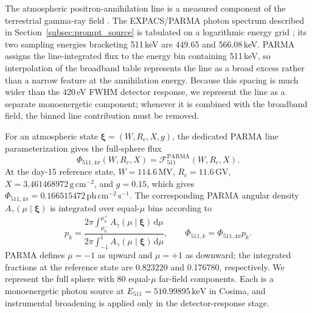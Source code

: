 \documentclass[11pt]{article}
\begin{document}
The atmospheric positron-annihilation line is a measured component of the
terrestrial gamma-ray field
\cite{Mahoney1981Atmospheric,Harris2003Atmospheric}. The EXPACS/PARMA photon
spectrum described in Section~\ref{subsec:prompt_source} is tabulated on a
logarithmic energy grid \cite{Sato2015EXPACS,Sato2016PARMA4}; its two sampling
energies bracketing 511\,keV are 449.65 and 566.08\,keV. PARMA assigns the
line-integrated flux to the energy bin containing 511\,keV, so interpolation of
the broadband table represents the line as a broad excess rather than a narrow
feature at the annihilation energy. Because this spacing is much wider than the
420\,eV FWHM detector response, we represent the line as a separate
monoenergetic component; whenever it is combined with the broadband field, the
binned line contribution must be removed.

For an atmospheric state $\boldsymbol{\xi}=(W,R_c,X,g)$, the dedicated PARMA
line parameterization gives the full-sphere flux
\begin{equation}
  \Phi_{511,4\pi}(W,R_c,X)
  =\mathcal{F}_{511}^{\mathrm{PARMA}}(W,R_c,X).
  \label{eq:atm511_flux}
\end{equation}
At the day-15 reference state, $W=114.6\,\mathrm{MV}$,
$R_c=11.6\,\mathrm{GV}$, $X=3.461468972\,\mathrm{g\,cm^{-2}}$, and $g=0.15$,
which gives
$\Phi_{511,4\pi}=0.166515472\,\mathrm{ph\,cm^{-2}\,s^{-1}}$. The corresponding
PARMA angular density $A_\gamma(\mu\mid\boldsymbol{\xi})$ is integrated over
equal-$\mu$ bins according to
\begin{equation}
  p_k=
  \frac{2\pi\int_{\mu_k^-}^{\mu_k^+}
        A_\gamma(\mu\mid\boldsymbol{\xi})\,\mathrm{d}\mu}
       {2\pi\int_{-1}^{1}
        A_\gamma(\mu\mid\boldsymbol{\xi})\,\mathrm{d}\mu},
  \qquad
  \Phi_{511,k}=\Phi_{511,4\pi}p_k .
  \label{eq:atm511_bins}
\end{equation}
PARMA defines $\mu=-1$ as upward and $\mu=+1$ as downward; the integrated
fractions at the reference state are 0.823220 and 0.176780, respectively. We
represent the full sphere with 80 equal-$\mu$ far-field components. Each is a
monoenergetic photon source at $E_{511}=510.99895\,\mathrm{keV}$ in Cosima, and
instrumental broadening is applied only in the detector-response stage.
\end{document}
